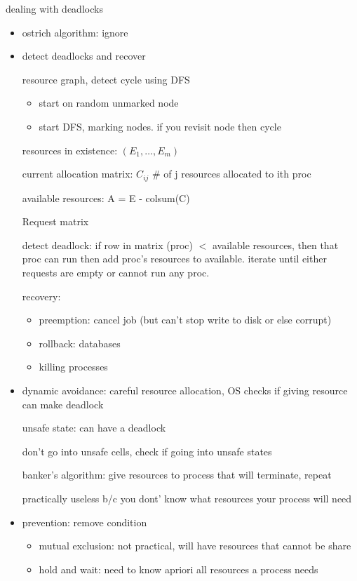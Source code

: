 \documentclass[11pt]{article}
\begin{document}
dealing with deadlocks
\begin{itemize}
    \item ostrich algorithm: ignore
    \item detect deadlocks and recover

        resource graph, detect cycle using DFS
        \begin{itemize}
            \item start on random unmarked node
            \item start DFS, marking nodes. if you revisit node then cycle
        \end{itemize}

        resources in existence: $(E_1, \dots, E_m)$

        current allocation matrix: $C_{ij}$ \# of j resources allocated to ith proc

        available resources: A = E - colsum(C)

        Request matrix

        detect deadlock: if row in matrix (proc) $<$ available resources, then that proc can run
        then add proc's resources to available. iterate until either requests are empty
        or cannot run any proc.

        recovery:
        \begin{itemize}
            \item preemption: cancel job (but can't stop write to disk or else corrupt)
            \item rollback: databases
            \item killing processes
        \end{itemize}

    \item dynamic avoidance: careful resource allocation, OS checks if giving resource can make deadlock

        unsafe state: can have a deadlock

        don't go into unsafe cells, check if going into unsafe states

        banker's algorithm: give resources to process that will terminate, repeat

        practically useless b/c you dont' know what resources your process will need

    \item prevention: remove condition
        \begin{itemize}
            \item mutual exclusion: not practical, will have resources that cannot be share
            \item hold and wait: need to know apriori all resources a process needs


\end{itemize}
\end{itemize}
\end{document}
